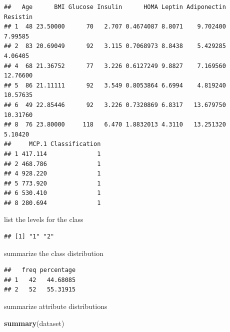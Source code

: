 \documentclass[]{book}
\newenvironment{Shaded}{\begin{snugshade}}{\end{snugshade}}
\newcommand{\DataTypeTok}[1]{\textcolor[rgb]{0.13,0.29,0.53}{#1}}
\newcommand{\DecValTok}[1]{\textcolor[rgb]{0.00,0.00,0.81}{#1}}
\newcommand{\KeywordTok}[1]{\textcolor[rgb]{0.13,0.29,0.53}{\textbf{#1}}}
\newcommand{\NormalTok}[1]{#1}
\newcommand{\OperatorTok}[1]{\textcolor[rgb]{0.81,0.36,0.00}{\textbf{#1}}}
\newcommand{\StringTok}[1]{\textcolor[rgb]{0.31,0.60,0.02}{#1}}
\begin{document}
\begin{verbatim}
##   Age      BMI Glucose Insulin      HOMA Leptin Adiponectin Resistin
## 1  48 23.50000      70   2.707 0.4674087 8.8071    9.702400  7.99585
## 2  83 20.69049      92   3.115 0.7068973 8.8438    5.429285  4.06405
## 4  68 21.36752      77   3.226 0.6127249 9.8827    7.169560 12.76600
## 5  86 21.11111      92   3.549 0.8053864 6.6994    4.819240 10.57635
## 6  49 22.85446      92   3.226 0.7320869 6.8317   13.679750 10.31760
## 8  76 23.80000     118   6.470 1.8832013 4.3110   13.251320  5.10420
##     MCP.1 Classification
## 1 417.114              1
## 2 468.786              1
## 4 928.220              1
## 5 773.920              1
## 6 530.410              1
## 8 280.694              1
\end{verbatim}

list the levels for the class

\begin{Shaded}
\end{Shaded}

\begin{verbatim}
## [1] "1" "2"
\end{verbatim}

summarize the class distribution

\begin{Shaded}
\end{Shaded}

\begin{verbatim}
##   freq percentage
## 1   42   44.68085
## 2   52   55.31915
\end{verbatim}

summarize attribute distributions

\begin{Shaded}
\begin{Highlighting}[]
\KeywordTok{summary}\NormalTok{(dataset)}
\end{Highlighting}
\end{Shaded}
\end{document}

